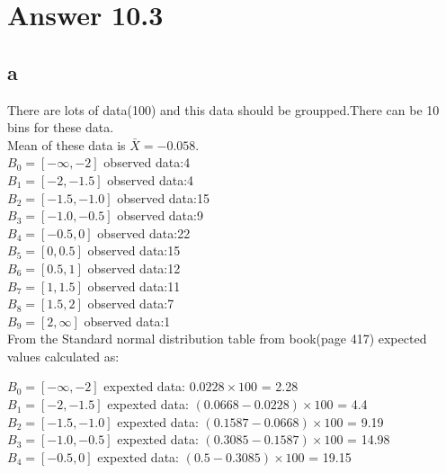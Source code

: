 \documentclass[11pt]{article}
\begin{document}
\section*{Answer 10.3}
\subsection*{a}

There are lots of data(100) and this data should be groupped.There can be 10 bins for these data.\\Mean of these data is $\bar{X}= -0.058$.\\ 

$B_0=[-\infty,-2]$ observed data:4\\

$B_1=[-2,-1.5]$ observed data:4\\

$B_2=[-1.5,-1.0]$ observed data:15\\

$B_3=[-1.0,-0.5]$ observed data:9\\

$B_4=[-0.5,0]$ observed data:22\\

$B_5=[0,0.5]$ observed data:15\\

$B_6=[0.5,1]$ observed data:12\\

$B_7=[1,1.5]$ observed data:11\\

$B_8=[1.5,2]$ observed data:7\\

$B_9=[2,\infty]$ observed data:1\\

From the Standard normal distribution table from book(page 417) expected values calculated as:

$B_0=[-\infty,-2]$ expexted data: $0.0228\times100$ = 2.28\\

$B_1=[-2,-1.5]$ expexted data: $(0.0668 -0.0228) \times100$ = 4.4\\

$B_2=[-1.5,-1.0]$ expexted data: $(0.1587-0.0668)\times100$ = 9.19\\

$B_3=[-1.0,-0.5]$ expexted data: $(0.3085-0.1587)\times100$ = 14.98\\

$B_4=[-0.5,0]$ expexted data: $(0.5-0.3085)\times100$ = 19.15\\
\end{document}
